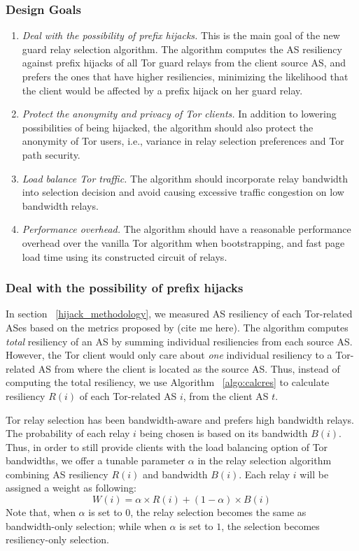\subsubsection{Design Goals}
\begin{enumerate}
\item \emph{Deal with the possibility of prefix hijacks.} This is the main goal of the new guard relay selection algorithm. The algorithm computes the AS resiliency against prefix hijacks of all Tor guard relays from the client source AS, and prefers the ones that have higher resiliencies, minimizing the likelihood that the client would be affected by a prefix hijack on her guard relay. 
\item \emph{Protect the anonymity and privacy of Tor clients.} In addition to lowering possibilities of being hijacked, the algorithm should also protect the anonymity of Tor users, i.e., variance in relay selection preferences and Tor path security. 
\item \emph{Load balance Tor traffic.} The algorithm should incorporate relay bandwidth into selection decision and avoid causing excessive traffic congestion on low bandwidth relays. 
\item \emph{Performance overhead.} The algorithm should have a reasonable performance overhead over the vanilla Tor algorithm when bootstrapping, and fast page load time using its constructed circuit of relays. 
\end{enumerate}

\subsubsection{Deal with the possibility of prefix hijacks}

In section ~\ref{hijack_methodology}, we measured AS resiliency of each Tor-related ASes based on the metrics proposed by (cite me here). The algorithm computes \emph{total} resiliency of an AS by summing individual resiliencies from each source AS. However, the Tor client would only care about \emph{one} individual resiliency to a Tor-related AS from where the client is located as the source AS. Thus, instead of computing the total resiliency, we use Algorithm ~\ref{algo:calcres} to calculate resiliency $R(i)$ of each Tor-related AS $i$, from the client AS $t$. 

Tor relay selection has been bandwidth-aware and prefers high bandwidth relays. The probability of each relay $i$ being chosen is based on its bandwidth $B(i)$. Thus, in order to still provide clients with the load balancing option of Tor bandwidths, we offer a tunable parameter $\alpha$ in the relay selection algorithm combining AS resiliency $R(i)$ and bandwidth $B(i)$. Each relay $i$ will be assigned a weight as following:
\begin{equation*}
W(i) = \alpha \times R(i) + (1 - \alpha) \times B(i)
\end{equation*}
Note that, when $\alpha$ is set to $0$, the relay selection becomes the same as bandwidth-only selection; while when $\alpha$ is set to $1$, the selection becomes resiliency-only selection. 

